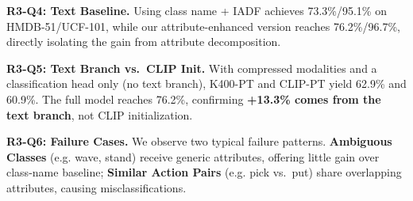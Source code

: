 \documentclass[10pt,twocolumn,letterpaper]{article}
\begin{document}
\noindent\textbf{\textcolor{green!55!black}{R3}-Q4: Text Baseline.} Using class name + IADF achieves 73.3\%/95.1\% on HMDB-51/UCF-101, while our attribute-enhanced version reaches 76.2\%/96.7\%, directly isolating the gain from attribute decomposition.

\noindent\textbf{\textcolor{green!55!black}{R3}-Q5: Text Branch vs.\ CLIP Init.} With compressed modalities and a classification head only (no text branch), K400-PT and CLIP-PT yield 62.9\% and 60.9\%. The full model reaches 76.2\%, confirming \textbf{+13.3\% comes from the text branch}, not CLIP initialization.

\noindent\textbf{\textcolor{green!55!black}{R3}-Q6: Failure Cases.} We observe two typical failure patterns. \textbf{Ambiguous Classes} (e.g. wave, stand) receive generic attributes, offering little gain over class-name baseline; \textbf{Similar Action Pairs} (e.g. pick vs.\ put) share overlapping attributes, causing misclassifications.
\end{document}
